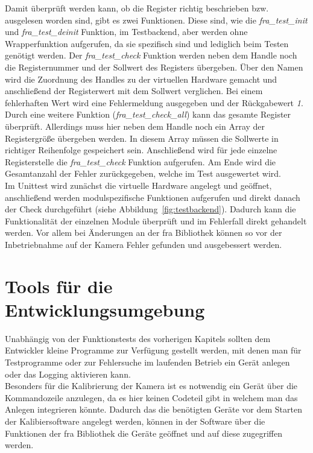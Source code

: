 Damit überprüft werden kann, ob die Register richtig beschrieben bzw. ausgelesen worden sind, gibt es zwei Funktionen. Diese sind, wie die \textit{fra\_test\_init} und \textit{fra\_test\_deinit} Funktion, im Testbackend, aber werden ohne Wrapperfunktion aufgerufen, da sie spezifisch sind und lediglich beim Testen genötigt werden.
Der \textit{fra\_test\_check} Funktion werden neben dem Handle noch die Registernummer und der Sollwert des Registers übergeben. Über den Namen wird die Zuordnung des Handles zu der virtuellen Hardware gemacht und anschließend der Registerwert mit dem Sollwert verglichen. Bei einem fehlerhaften Wert wird eine Fehlermeldung ausgegeben und der Rückgabewert \textit{1}.
Durch eine weitere Funktion (\textit{fra\_test\_check\_all}) kann das gesamte Register überprüft. Allerdings muss hier neben dem Handle noch ein Array der Registergröße übergeben werden. In diesem Array müssen die Sollwerte in richtiger Reihenfolge gespeichert sein. Anschließend wird für jede einzelne Registerstelle die \textit{fra\_test\_check} Funktion aufgerufen. Am Ende wird die Gesamtanzahl der Fehler zurückgegeben, welche im Test ausgewertet wird.\\


Im Unittest wird zunächst die virtuelle Hardware angelegt und geöffnet, anschließend werden modulspezifische Funktionen aufgerufen und direkt danach der Check durchgeführt (siehe Abbildung~\ref{fig:testbackend}). Dadurch kann die Funktionalität der einzelnen Module überprüft und im Fehlerfall direkt gehandelt werden. Vor allem bei Änderungen an der \ac{fra} Bibliothek können so vor der Inbetriebnahme auf der Kamera Fehler gefunden und ausgebessert werden.


\section{Tools für die Entwicklungsumgebung}
Unabhängig von der Funktionstests des vorherigen Kapitels sollten dem Entwickler kleine Programme zur Verfügung gestellt werden, mit denen man für Testprogramme oder zur Fehlersuche im laufenden Betrieb ein Gerät anlegen oder das Logging aktivieren kann.\\


Besonders für die Kalibrierung der Kamera ist es notwendig ein Gerät über die Kommandozeile anzulegen, da es hier keinen Codeteil gibt in welchem man das Anlegen integrieren könnte. Dadurch das die benötigten Geräte vor dem Starten der Kalibiersoftware angelegt werden, können in der Software über die Funktionen der \ac{fra} Bibliothek die Geräte geöffnet und auf diese zugegriffen werden.


